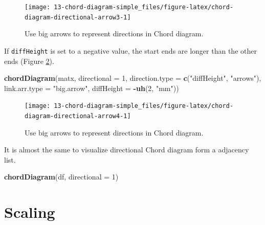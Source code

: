 \documentclass[]{book}
\newenvironment{Shaded}{\begin{snugshade}}{\end{snugshade}}
\newcommand{\KeywordTok}[1]{\textcolor[rgb]{0.13,0.29,0.53}{\textbf{#1}}}
\newcommand{\DataTypeTok}[1]{\textcolor[rgb]{0.13,0.29,0.53}{#1}}
\newcommand{\DecValTok}[1]{\textcolor[rgb]{0.00,0.00,0.81}{#1}}
\newcommand{\StringTok}[1]{\textcolor[rgb]{0.31,0.60,0.02}{#1}}
\newcommand{\OperatorTok}[1]{\textcolor[rgb]{0.81,0.36,0.00}{\textbf{#1}}}
\newcommand{\NormalTok}[1]{#1}
\begin{document}
\begin{figure}

{\centering \texttt{[image: 13-chord-diagram-simple\_files/figure-latex/chord-diagram-directional-arrow3-1]} 

}

\caption{Use big arrows to represent directions in Chord diagram.}\label{fig:chord-diagram-directional-arrow3}
\end{figure}

If \texttt{diffHeight} is set to a negative value, the start ends are
longer than the other ends (Figure
\ref{fig:chord-diagram-directional-arrow4}).

\begin{Shaded}
\begin{Highlighting}[]
\KeywordTok{chordDiagram}\NormalTok{(matx, }\DataTypeTok{directional =} \DecValTok{1}\NormalTok{, }\DataTypeTok{direction.type =} \KeywordTok{c}\NormalTok{(}\StringTok{"diffHeight"}\NormalTok{, }\StringTok{"arrows"}\NormalTok{),}
    \DataTypeTok{link.arr.type =} \StringTok{"big.arrow"}\NormalTok{, }\DataTypeTok{diffHeight =} \OperatorTok{-}\KeywordTok{uh}\NormalTok{(}\DecValTok{2}\NormalTok{, }\StringTok{"mm"}\NormalTok{))}
\end{Highlighting}
\end{Shaded}

\begin{figure}

{\centering \texttt{[image: 13-chord-diagram-simple\_files/figure-latex/chord-diagram-directional-arrow4-1]} 

}

\caption{Use big arrows to represent directions in Chord diagram.}\label{fig:chord-diagram-directional-arrow4}
\end{figure}

It is almost the same to visualize directional Chord diagram form a
adjacency list.

\begin{Shaded}
\begin{Highlighting}[]
\KeywordTok{chordDiagram}\NormalTok{(df, }\DataTypeTok{directional =} \DecValTok{1}\NormalTok{)}
\end{Highlighting}
\end{Shaded}

\section{Scaling}\label{scaling}
\end{document}
